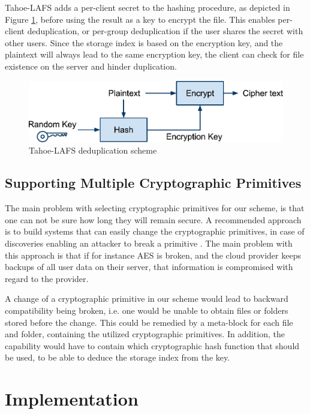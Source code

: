 \documentclass[pdftex,english,10pt,b5paper,twoside]{book}
\begin{document}
Tahoe-\ac{LAFS} adds a per-client secret to the hashing procedure, as
depicted in Figure \ref{fig:tahoe:dedup}, before using the result as a key to
encrypt the file. This enables per-client deduplication, or per-group
deduplication if the user shares the secret with other users. Since the storage
index is based on the encryption key, and the plaintext will always lead to the
same encryption key, the client can check for file existence on the server and
hinder duplication.

\begin{figure}[!h]
    \centering
    \includegraphics[scale=0.55]{TahoeDeduplication.pdf}
    \caption{Tahoe-LAFS deduplication scheme}
    \label{fig:tahoe:dedup}
\end{figure}

\subsection{Supporting Multiple Cryptographic Primitives} 

The main problem with selecting cryptographic primitives for our scheme, is
that one can not be sure how long they will remain secure. A recommended
approach is to build systems that can easily change the cryptographic
primitives, in case of discoveries enabling an attacker to break a primitive
\cite{schneier}. The main problem with this approach is that if for instance
\ac{AES} is broken, and the cloud provider keeps backups of all user data on
their server, that information is compromised with regard to the provider.

A change of a cryptographic primitive in our scheme would lead to backward
compatibility being broken, i.e. one would be unable to obtain files or folders
stored before the change. This could be remedied by a meta-block for each file
and folder, containing the utilized cryptographic primitives. In addition, the
capability would have to contain which cryptographic hash function that should
be used, to be able to deduce the storage index from the key.

\section{Implementation}
\label{sec:DIS:impl}
\end{document}
